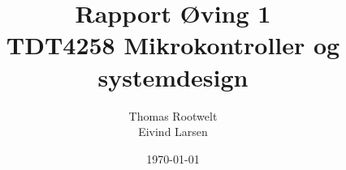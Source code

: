 \documentclass[a4paper,10pt]{article}
\title{Rapport Øving 1 \\ TDT4258 Mikrokontroller og systemdesign}
\author{Thomas Rootwelt\\Eivind Larsen}
\date{\today}
\begin{document}
\maketitle

\newpage	
\begin{abstract}

\end{abstract}

\newpage	
\tableofcontents
\newpage	





\newpage	

\end{document}

